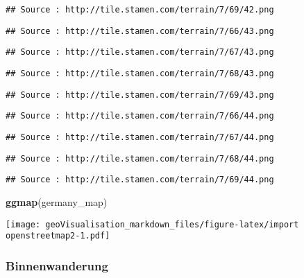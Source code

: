 \documentclass[]{article}
\newenvironment{Shaded}{\begin{snugshade}}{\end{snugshade}}
\newcommand{\KeywordTok}[1]{\textcolor[rgb]{0.13,0.29,0.53}{\textbf{#1}}}
\newcommand{\NormalTok}[1]{#1}
\begin{document}
\begin{verbatim}
## Source : http://tile.stamen.com/terrain/7/69/42.png
\end{verbatim}

\begin{verbatim}
## Source : http://tile.stamen.com/terrain/7/66/43.png
\end{verbatim}

\begin{verbatim}
## Source : http://tile.stamen.com/terrain/7/67/43.png
\end{verbatim}

\begin{verbatim}
## Source : http://tile.stamen.com/terrain/7/68/43.png
\end{verbatim}

\begin{verbatim}
## Source : http://tile.stamen.com/terrain/7/69/43.png
\end{verbatim}

\begin{verbatim}
## Source : http://tile.stamen.com/terrain/7/66/44.png
\end{verbatim}

\begin{verbatim}
## Source : http://tile.stamen.com/terrain/7/67/44.png
\end{verbatim}

\begin{verbatim}
## Source : http://tile.stamen.com/terrain/7/68/44.png
\end{verbatim}

\begin{verbatim}
## Source : http://tile.stamen.com/terrain/7/69/44.png
\end{verbatim}

\begin{Shaded}
\begin{Highlighting}[]
\KeywordTok{ggmap}\NormalTok{(germany_map)}
\end{Highlighting}
\end{Shaded}

\texttt{[image: geoVisualisation\_markdown\_files/figure-latex/import openstreetmap2-1.pdf]}

\hypertarget{binnenwanderung}{%
\subsubsection{Binnenwanderung}\label{binnenwanderung}}
\end{document}
